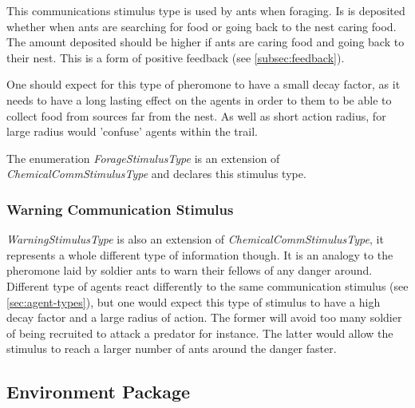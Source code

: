 This communications stimulus type is used by ants when foraging. Is is deposited whether when ants are searching for food or going back to the nest caring food. The amount deposited should be higher if ants are caring food and going back to their nest. This is a form of positive feedback (see \ref{subsec:feedback}).

One should expect for this type of pheromone to have a small decay factor, as it needs to have a long lasting effect on the agents in order to them to be able to collect food from sources far from the nest. As well as short action radius, for large radius would 'confuse' agents within the trail.

The enumeration \emph{ForageStimulusType} is an extension of \emph{ChemicalCommStimulusType} and declares this stimulus type.

\subsubsection {Warning Communication Stimulus}

\emph{WarningStimulusType} is also an extension of \emph{ChemicalCommStimulusType}, it represents a whole different type of information though. It is an analogy to the pheromone laid by soldier ants to warn their fellows of any danger around. Different type of agents react differently to the same communication stimulus (see \ref{sec:agent-types}), but one would expect this type of stimulus to have a high decay factor and a large radius of action. The former will avoid too many soldier of being recruited to attack a predator for instance. The latter would allow the stimulus to reach a larger number of ants around the danger faster.

\subsection{Environment Package}

